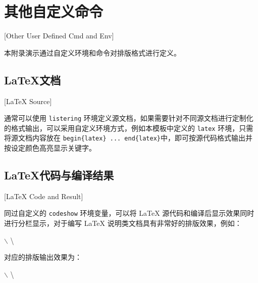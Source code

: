 
%
%
%

\chapter{其他自定义命令}[Other User Defined Cmd and Env]
\label{AppCustom}

本附录演示通过自定义环境和命令对排版格式进行定义。

\section{\LaTeX{}文档}[\LaTeX{} Source]

通常可以使用 \texttt{listering} 环境定义源文档，如果需要针对不同源文档进行定制化的格式输出，可以采用自定义环境方式，例如本模板中定义的 \texttt{latex} 环境，只需将源文档内容放在 \texttt{\cs begin\{latex\} ... \cs end\{latex\}}中，即可按源代码格式输出并按设定颜色高亮显示关键字。


\section{\LaTeX{}代码与编译结果}[\LaTeX{} Code and Result]

同过自定义的 \texttt{codeshow} 环境变量，可以将 \LaTeX{} 源代码和编译后显示效果同时进行分栏显示，对于编写 \LaTeX{} 说明类文档具有非常好的排版效果，例如：

\begin{latex}
\begin{codeshow}
$\backslash$ 
\textbackslash
\texttt{}
\end{codeshow}
\end{latex}

对应的排版输出效果为：

\begin{codeshow}
$\backslash$ 
\textbackslash
\texttt{}
\end{codeshow}

